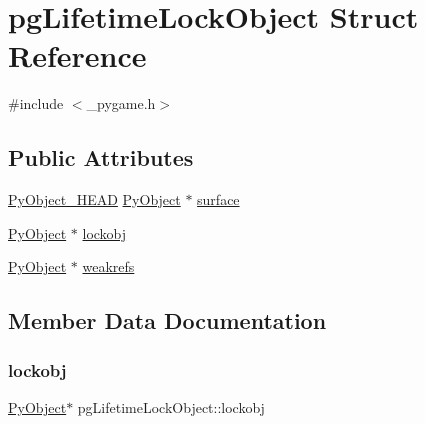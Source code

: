 \hypertarget{structpg_lifetime_lock_object}{}\section{pg\+Lifetime\+Lock\+Object Struct Reference}
\label{structpg_lifetime_lock_object}


{\ttfamily \#include $<$\+\_\+pygame.\+h$>$}

\subsection*{Public Attributes}
\begin{DoxyCompactItemize}
\item 
\mbox{\hyperlink{_python27_2object_8h_a0bf35c1f3ea13f925de94d8593db3b7e}{Py\+Object\+\_\+\+H\+E\+AD}} \mbox{\hyperlink{_python27_2object_8h_aadc84ac7aed2cfa6f20c25f62bf3dac7}{Py\+Object}} $\ast$ \mbox{\hyperlink{structpg_lifetime_lock_object_af7cc80dd8cce31b21a70403ff5f690c8}{surface}}
\item 
\mbox{\hyperlink{_python27_2object_8h_aadc84ac7aed2cfa6f20c25f62bf3dac7}{Py\+Object}} $\ast$ \mbox{\hyperlink{structpg_lifetime_lock_object_adc15d2e17d0be174ebaadbe21e799bff}{lockobj}}
\item 
\mbox{\hyperlink{_python27_2object_8h_aadc84ac7aed2cfa6f20c25f62bf3dac7}{Py\+Object}} $\ast$ \mbox{\hyperlink{structpg_lifetime_lock_object_a44b00b87ed039f7638aae5c8fc1430ec}{weakrefs}}
\end{DoxyCompactItemize}


\subsection{Member Data Documentation}
\mbox{\label{structpg_lifetime_lock_object_adc15d2e17d0be174ebaadbe21e799bff}} 
\subsubsection{\texorpdfstring{lockobj}{lockobj}}
{\footnotesize\ttfamily \mbox{\hyperlink{_python27_2object_8h_aadc84ac7aed2cfa6f20c25f62bf3dac7}{Py\+Object}}$\ast$ pg\+Lifetime\+Lock\+Object\+::lockobj}

\mbox{\label{structpg_lifetime_lock_object_af7cc80dd8cce31b21a70403ff5f690c8}} 
